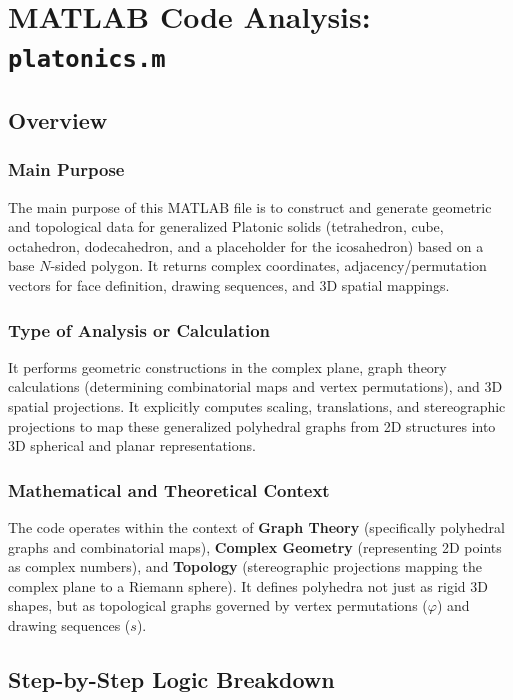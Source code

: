 
\chapter{MATLAB Code Analysis: \texttt{platonics.m}}
\date{}


\maketitle

\section{Overview}

\subsection{Main Purpose}
The main purpose of this MATLAB file is to construct and generate geometric and topological data for generalized Platonic solids (tetrahedron, cube, octahedron, dodecahedron, and a placeholder for the icosahedron) based on a base $N$-sided polygon. It returns complex coordinates, adjacency/permutation vectors for face definition, drawing sequences, and 3D spatial mappings.

\subsection{Type of Analysis or Calculation}
It performs geometric constructions in the complex plane, graph theory calculations (determining combinatorial maps and vertex permutations), and 3D spatial projections. It explicitly computes scaling, translations, and stereographic projections to map these generalized polyhedral graphs from 2D structures into 3D spherical and planar representations.

\subsection{Mathematical and Theoretical Context}
The code operates within the context of \textbf{Graph Theory} (specifically polyhedral graphs and combinatorial maps), \textbf{Complex Geometry} (representing 2D points as complex numbers), and \textbf{Topology} (stereographic projections mapping the complex plane to a Riemann sphere). It defines polyhedra not just as rigid 3D shapes, but as topological graphs governed by vertex permutations ($\varphi$) and drawing sequences ($s$).

\section{Step-by-Step Logic Breakdown}

